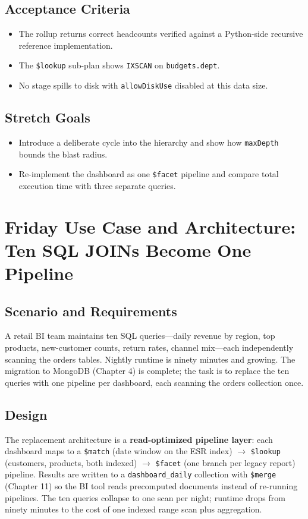 \subsection*{Acceptance Criteria}
\begin{itemize}
    \item The rollup returns correct headcounts verified against a Python-side recursive reference implementation.
    \item The \texttt{\$lookup} sub-plan shows \texttt{IXSCAN} on \texttt{budgets.dept}.
    \item No stage spills to disk with \texttt{allowDiskUse} disabled at this data size.
\end{itemize}

\subsection*{Stretch Goals}
\begin{itemize}
    \item Introduce a deliberate cycle into the hierarchy and show how \texttt{maxDepth} bounds the blast radius.
    \item Re-implement the dashboard as one \texttt{\$facet} pipeline and compare total execution time with three separate queries.
\end{itemize}

\section{Friday Use Case and Architecture: Ten SQL JOINs Become One Pipeline}
\subsection{Scenario and Requirements}
A retail BI team maintains ten SQL queries---daily revenue by region, top products, new-customer counts, return rates, channel mix---each independently scanning the orders tables. Nightly runtime is ninety minutes and growing. The migration to MongoDB (Chapter 4) is complete; the task is to replace the ten queries with one pipeline per dashboard, each scanning the orders collection once.

\subsection{Design}
The replacement architecture is a \textbf{read-optimized pipeline layer}: each dashboard maps to a \texttt{\$match} (date window on the ESR index) $\to$ \texttt{\$lookup} (customers, products, both indexed) $\to$ \texttt{\$facet} (one branch per legacy report) pipeline. Results are written to a \texttt{dashboard\_daily} collection with \texttt{\$merge} (Chapter 11) so the BI tool reads precomputed documents instead of re-running pipelines. The ten queries collapse to one scan per night; runtime drops from ninety minutes to the cost of one indexed range scan plus aggregation.

